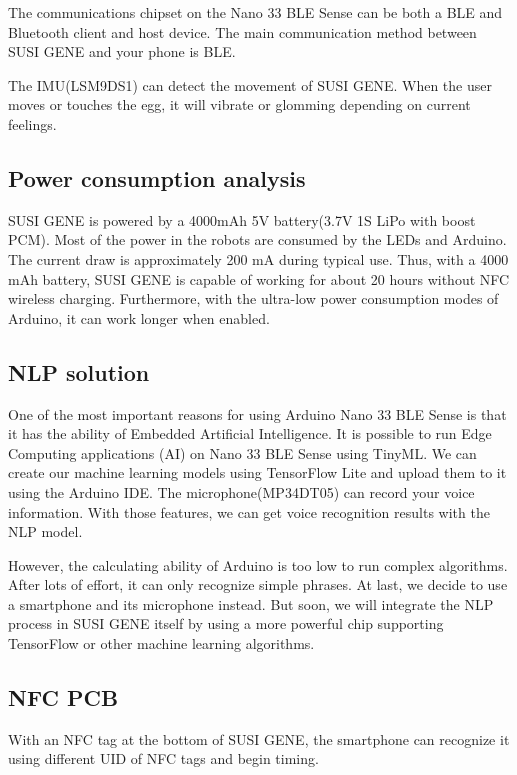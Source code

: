 \documentclass[manuscript,screen]{acmart}
\begin{document}
The communications chipset on the Nano 33 BLE Sense can be both a BLE and Bluetooth client and host device. The main communication method between SUSI GENE and your phone is BLE.

The IMU(LSM9DS1) can detect the movement of SUSI GENE. When the user moves or touches the egg, it will vibrate or glomming depending on current feelings.

\subsection{Power consumption analysis}

SUSI GENE is powered by a 4000mAh 5V battery(3.7V 1S LiPo with boost PCM). Most of the power in the robots are consumed by the LEDs and Arduino. The current draw is approximately 200 mA during typical use. Thus, with a 4000 mAh battery, SUSI GENE is capable of working for about 20 hours without NFC wireless charging. Furthermore, with the ultra-low power consumption modes of Arduino, it can work longer when enabled.

\subsection{NLP solution}

One of the most important reasons for using Arduino Nano 33 BLE Sense is that it has the ability of Embedded Artificial Intelligence. It is possible to run Edge Computing applications (AI) on Nano 33 BLE Sense using TinyML. We can create our machine learning models using TensorFlow Lite and upload them to it using the Arduino IDE. The microphone(MP34DT05) can record your voice information. With those features, we can get voice recognition results with the NLP model.

However, the calculating ability of Arduino is too low to run complex algorithms. After lots of effort, it can only recognize simple phrases. At last, we decide to use a smartphone and its microphone instead. But soon, we will integrate the NLP process in SUSI GENE itself by using a more powerful chip supporting TensorFlow or other machine learning algorithms. 

\subsection{NFC PCB}

With an NFC tag at the bottom of SUSI GENE, the smartphone can recognize it using different UID of NFC tags and begin timing.
\end{document}

